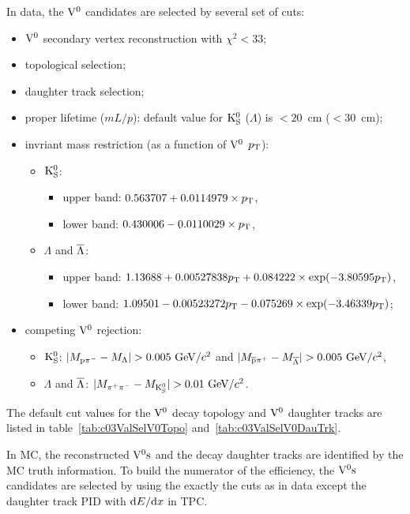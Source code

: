 In data, the ${\rm V}^{0}$ candidates are selected by several set of cuts:
\begin{itemize}
\item ${\rm V}^{0}$ secondary vertex reconstruction with $\chi^{2}<33$;
\item topological selection;
\item daughter track selection;
\item proper lifetime ($mL/p$):
      default value for ${\rm K}_{\rm S}^{0}$ ($\Lambda$) is $<20$~cm ($<30$~cm);
\item invriant mass restriction (as a function of ${\rm V}^{0}$ $p_{\rm T}$):
      \begin{itemize}
      \item ${\rm K}_{\rm S}^{0}$:
            \begin{itemize}
            \item upper band: $0.563707+0.0114979\times p_{\rm T}$,
            \item lower band: $0.430006-0.0110029\times p_{\rm T}$,
            \end{itemize}
      \item $\Lambda$ and $\overline{\Lambda}$:
            \begin{itemize}
            \item upper band:
                  $1.13688+0.00527838p_{\rm T}+0.084222\times\exp(-3.80595p_{\rm T})$,
            \item lower band:
                  $1.09501-0.00523272p_{\rm T}-0.075269\times\exp(-3.46339p_{\rm T})$;
            \end{itemize}
      \end{itemize}
\item competing ${\rm V}^{0}$ rejection:
      \begin{itemize}
      \item ${\rm K}_{\rm S}^{0}$: $|M_{{\rm p}\pim}-M_{\Lambda}|>0.005~\GeVcc$ and 
                       $|M_{\pbar\pip}-M_{\AntiLa}|>0.005~\GeVcc$,
      \item $\Lambda$ and $\overline{\Lambda}$: $|M_{\pip\pim}-M_{\Kshort}|>0.01~\GeVcc$.
      \end{itemize}
\end{itemize}
The default cut values for the ${\rm V}^{0}$ decay topology and ${\rm V}^{0}$
daughter tracks are listed in table~\ref{tab:c03ValSelV0Topo}
and~\ref{tab:c03ValSelV0DauTrk}.

In MC, the reconstructed ${\rm V}^{0}{\rm s}$ and the decay daughter tracks are
identified by the MC truth information.
To build the numerator of the efficiency,
the ${\rm V}^{0}{\rm s}$ candidates are selected by using the exactly the cuts as
in data except the daughter track PID with ${\rm d}E/{\rm d}x$ in TPC.

